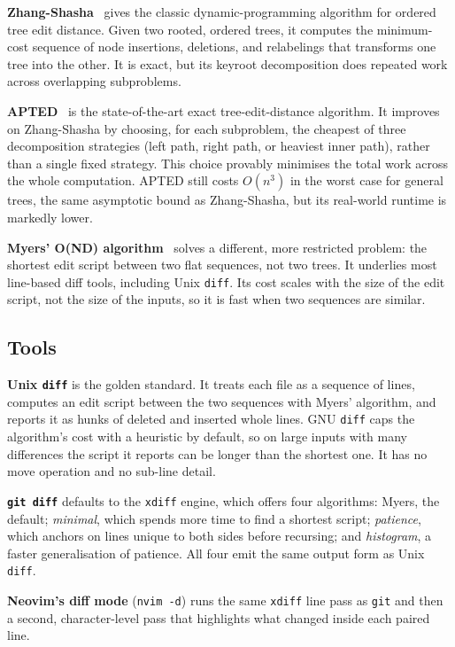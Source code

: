 \documentclass[sigconf]{acmart}
\begin{document}
\textbf{Zhang-Shasha}~\cite{zhang-shasha-1989} gives the classic dynamic-programming algorithm for
ordered tree edit distance. Given two rooted, ordered trees, it computes the minimum-cost sequence
of node insertions, deletions, and relabelings that transforms one tree into the other. It is
exact, but its keyroot decomposition does repeated work across overlapping subproblems.

\textbf{APTED}~\cite{apted-2015} is the state-of-the-art exact tree-edit-distance algorithm. It
improves on Zhang-Shasha by choosing, for each subproblem, the cheapest of three decomposition
strategies (left path, right path, or heaviest inner path), rather than a single fixed strategy.
This choice provably minimises the total work across the whole computation. APTED still costs
$O(n^3)$ in the worst case for general trees, the same asymptotic bound as Zhang-Shasha, but its
real-world runtime is markedly lower.

\textbf{Myers' O(ND) algorithm}~\cite{myers-1986} solves a different, more restricted problem: the
shortest edit script between two flat sequences, not two trees. It underlies most line-based diff
tools, including Unix \texttt{diff}. Its cost scales with the size of the edit script, not the size
of the inputs, so it is fast when two sequences are similar.

\subsection{Tools}

\textbf{Unix \texttt{diff}} is the golden standard. It treats each file as a sequence of lines,
computes an edit script between the two sequences with Myers' algorithm, and reports it as hunks of
deleted and inserted whole lines. GNU \texttt{diff} caps the algorithm's cost with a heuristic by
default, so on large inputs with many differences the script it reports can be longer than the
shortest one. It has no move operation and no sub-line detail.

\textbf{\texttt{git diff}} defaults to the \texttt{xdiff} engine, which offers four
algorithms: Myers, the default; \emph{minimal}, which spends more time to find a shortest script; \emph{patience}, which
anchors on lines unique to both sides before recursing; and \emph{histogram}, a faster
generalisation of patience. All four emit the same output form as Unix \texttt{diff}.

\textbf{Neovim's diff mode} (\texttt{nvim -d}) runs the same \texttt{xdiff} line pass as
\texttt{git} and then a second, character-level pass that highlights what changed inside
each paired line.
\end{document}
